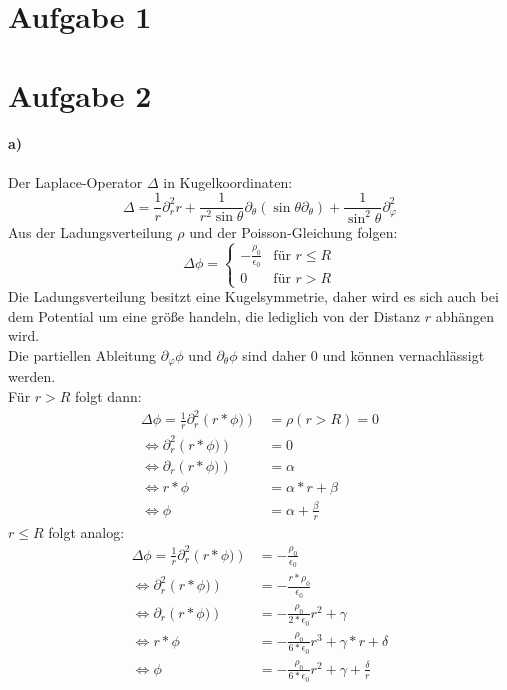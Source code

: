 \documentclass[a4paper]{article}
\newcommand{\epszero}{\epsilon_0}
\begin{document}
\thispagestyle{fancy}

\section*{Aufgabe 1}

\newpage
\setlength{\headheight}{0cm}

\section*{Aufgabe 2}
\paragraph{a)}
Der Laplace-Operator $\Delta$ in Kugelkoordinaten:
\[
	\Delta =
	\frac{1}{r} \partial_r^2r 
	+ \frac1{r^2\sin\theta} \partial_\theta
	\left(
		\sin\theta \partial_\theta
	\right)
	+
	\frac1{\sin^2\theta} \partial_\varphi^2
\]
Aus der Ladungsverteilung $\rho$ und der Poisson-Gleichung folgen:
\[
	\Delta \phi = 
	\begin{cases}
		-\frac{\rho_0}{\epszero} &\text{für } r \leq R \\
		0 &\text{für } r > R
	\end{cases}
\]
Die Ladungsverteilung besitzt eine Kugelsymmetrie, daher wird es sich auch
bei dem Potential um eine größe handeln, die lediglich von der Distanz $r$
abhängen wird.\\
Die partiellen Ableitung $\partial_\varphi\phi$ und $\partial_\theta\phi$ 
sind daher 0 und können vernachlässigt werden.\\
Für $r > R$ folgt dann:
\begin{align*}
	\Delta \phi
	= \frac1r \partial_r^2 \left(r * \phi) \right)
	&= \rho(r > R) = 0\\
	\Leftrightarrow
	\partial_r^2 \left(r * \phi) \right) 
	&= 0 \\
	\Leftrightarrow
	\partial_r \left(r * \phi) \right) 
	&= \alpha \\
	\Leftrightarrow
	r * \phi
	&= \alpha * r + \beta \\
	\Leftrightarrow
	\phi
	&= \alpha + \frac\beta r 
\end{align*}
$r \leq R$ folgt analog:
\begin{align*}
	\Delta \phi
	= \frac1r \partial_r^2 \left(r * \phi) \right)
	&= -\frac{\rho_0}{\epszero} \\
	\Leftrightarrow
	\partial_r^2 \left(r * \phi) \right) 
	&= -\frac{r * \rho_0}{\epszero} \\
	\Leftrightarrow
	\partial_r \left(r * \phi) \right)
	&= -\frac{\rho_0}{2 * \epszero} r^2 + \gamma \\
	\Leftrightarrow
	r * \phi
	&= -\frac{\rho_0}{6 * \epszero} r^3 + \gamma * r + \delta \\
	\Leftrightarrow
	\phi
	&= -\frac{\rho_0}{6 * \epszero} r^2 + \gamma + \frac\delta r 
\end{align*}
\end{document}
